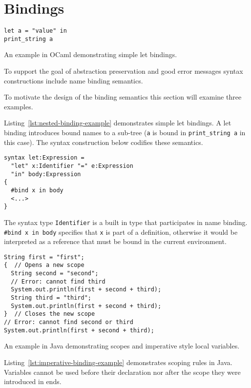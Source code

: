 \documentclass{kththesis}
\begin{document}
\section{Bindings} \label{sec:design-bindings}

\begin{listing}[h]
\begin{verbatim}
let a = "value" in
print_string a
\end{verbatim}
\caption{An example in OCaml demonstrating simple let bindings.}
\label{lst:nested-binding-example}
\end{listing}

To support the goal of abstraction preservation and good error messages syntax constructions include name binding semantics.

To motivate the design of the binding semantics this section will examine three examples.

Listing~\ref{lst:nested-binding-example} demonstrates simple let bindings. A let binding introduces bound names to a sub-tree (\texttt{a} is bound in \texttt{print_string a} in this case). The syntax construction below codifies these semantics.

\begin{verbatim}
syntax let:Expression =
  "let" x:Identifier "=" e:Expression
  "in" body:Expression
{
  #bind x in body
  <...>
}
\end{verbatim}

The syntax type \texttt{Identifier} is a built in type that participates in name binding. \texttt{#bind x in body} specifies that \texttt{x} is part of a definition, otherwise it would be interpreted as a reference that must be bound in the current environment.

\begin{listing}[h]
\begin{verbatim}
String first = "first";
{  // Opens a new scope
  String second = "second";
  // Error: cannot find third
  System.out.println(first + second + third);
  String third = "third";
  System.out.println(first + second + third);
}  // Closes the new scope
// Error: cannot find second or third
System.out.println(first + second + third);
\end{verbatim}
\caption{An example in Java demonstrating scopes and imperative style local variables.}
\label{lst:imperative-binding-example}
\end{listing}

Listing~\ref{lst:imperative-binding-example} demonstrates scoping rules in Java. Variables cannot be used before their declaration nor after the scope they were introduced in ends.
\end{document}
